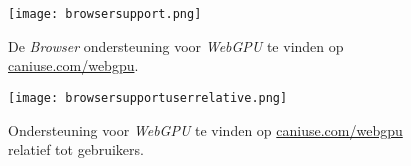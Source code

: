 \begin{figure}
    \texttt{[image: browsersupport.png]}
    \caption[Ondersteuning voor \textit{WebGPU} \autocite{Deveria2024}]{
        De \textit{Browser} ondersteuning voor \textit{WebGPU} te vinden op \href{https://caniuse.com/webgpu}{caniuse.com/webgpu}. \autocite{Deveria2024}
    }
    \label{fig:Browser Support}
\end{figure}

\begin{figure}
    \texttt{[image: browsersupportuserrelative.png]}
    \caption[\textit{Browser} gebruiker toegang tot \textit{WebGPU} \autocite{Deveria2024}]{
        Ondersteuning voor \textit{WebGPU} te vinden op \href{https://caniuse.com/webgpu}{caniuse.com/webgpu} relatief tot gebruikers. \autocite{Deveria2024}
    }
    \label{fig:Relative Browser Support}
\end{figure}